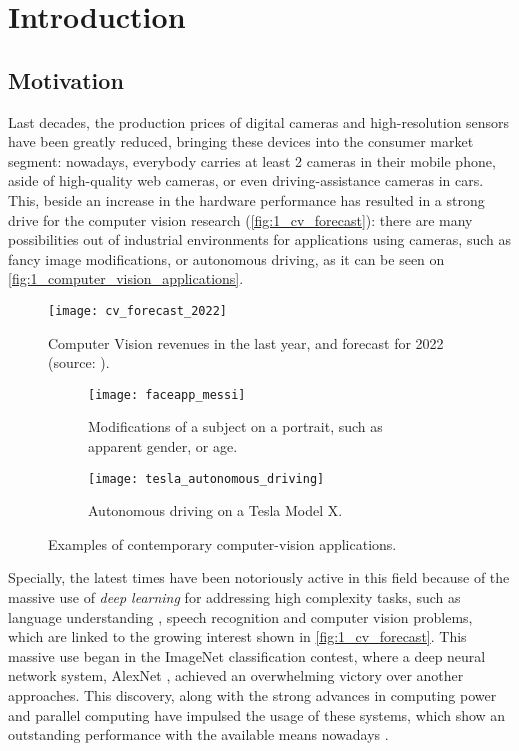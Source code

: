 \chapter{Introduction}
\section{Motivation}
	
Last decades, the production prices of digital cameras and high-resolution sensors have been greatly reduced, bringing these devices into the consumer market segment: nowadays, everybody carries at least 2 cameras in their mobile phone, aside of high-quality web cameras, or even driving-assistance cameras in cars. This, beside an increase in the hardware performance has resulted in a strong drive for the computer vision research (\autoref{fig:1_cv_forecast}): there are many possibilities out of industrial environments for applications using cameras, such as fancy image modifications, or autonomous driving, as it can be seen on \autoref{fig:1_computer_vision_applications}.

\begin{figure}[h]
	\centering
	\texttt{[image: cv\_forecast\_2022]}
	\caption{Computer Vision revenues in the last year, and forecast for 2022 (source: \cite{cv_forecast}).}
	\label{fig:1_cv_forecast}
\end{figure}


\begin{figure}[h]
	\centering
	\begin{subfigure}[t]{0.45\linewidth}
		\centering
		\texttt{[image: faceapp\_messi]}
		\caption{Modifications of a subject on a portrait, such as apparent gender, or age.}
	\end{subfigure}
	\begin{subfigure}[t]{0.45\linewidth}
		\centering
		\texttt{[image: tesla\_autonomous\_driving]}
		\caption{Autonomous driving on a Tesla Model X.}
	\end{subfigure}
	\caption{Examples of contemporary computer-vision applications.}
	\label{fig:1_computer_vision_applications}
\end{figure}

Specially, the latest times have been notoriously active in this field because of the massive use of \textit{deep learning} for addressing high complexity tasks, such as language understanding \cite{gpt2}, speech recognition \cite{speech_neural} and computer vision problems, which are linked to the growing interest shown in \autoref{fig:1_cv_forecast}. This massive use began in the ImageNet classification contest, where a deep neural network system, AlexNet \cite{alexnet}, achieved an overwhelming victory over another approaches. This discovery, along with the strong advances in computing power and parallel computing have impulsed the usage of these systems, which show an outstanding performance with the available means nowadays \cite{diapos_deep_learning}.\\


